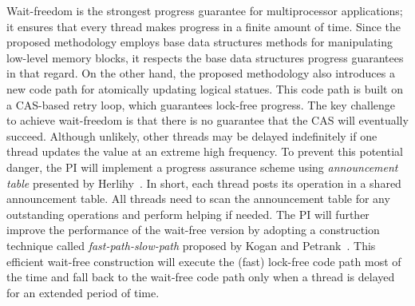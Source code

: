 \documentclass{article}
\begin{document}
Wait-freedom is the strongest progress guarantee for multiprocessor applications; it ensures that every thread makes progress in a finite amount of time.
Since the proposed methodology employs base data structures methods for manipulating low-level memory blocks, it respects the base data structures progress guarantees in that regard.
On the other hand, the proposed methodology also introduces a new code path for atomically updating logical statues.
This code path is built on a CAS-based retry loop, which guarantees lock-free progress.
The key challenge to achieve wait-freedom is that there is no guarantee that the CAS will eventually succeed. 
Although unlikely, other threads may be delayed indefinitely if one thread updates the value at an extreme high frequency.
To prevent this potential danger, the PI will implement a progress assurance scheme using \emph{announcement table} presented by Herlihy~\cite{herlihy1993methodology}.
In short, each thread posts its operation in a shared announcement table.
All threads need to scan the announcement table for any outstanding operations and perform helping if needed.
The PI will further improve the performance of the wait-free version by adopting a construction technique called \emph{fast-path-slow-path} proposed by Kogan and Petrank~\cite{kogan2012methodology}.
This efficient wait-free construction will execute the (fast) lock-free code path most of the time and fall back to the wait-free code path only when a thread is delayed for an extended period of time.
\end{document}
